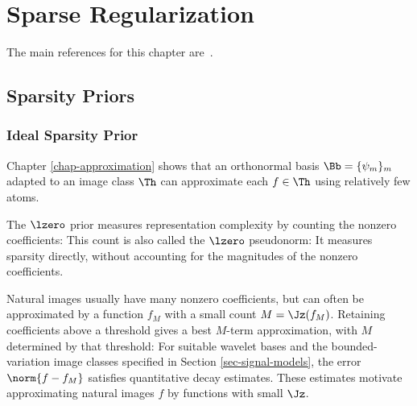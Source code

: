 
\chapter{Sparse Regularization}
\label{chap-sparse-regul}

The main references for this chapter are~\cite{mallat2008wavelet,starck2015sparse,scherzer2009variational}.


\section{Sparsity Priors}

\subsection{Ideal Sparsity Prior}

Chapter \ref{chap-approximation} shows that an orthonormal basis $\Bb = \{ \psi_m \}_m$ adapted to an image class $\Th$ can approximate each $f\in\Th$ using relatively few atoms.

The $\lzero$ prior measures representation complexity by counting the nonzero coefficients:
This count is also called the $\lzero$ pseudonorm:
It measures sparsity directly, without accounting for the magnitudes of the nonzero coefficients.

Natural images usually have many nonzero coefficients, but can often be approximated by a function $f_M$ with a small count $M=\Jz(f_M)$. Retaining coefficients above a threshold gives a best $M$-term approximation, with $M$ determined by that threshold:
For suitable wavelet bases and the bounded-variation image classes specified in Section \ref{sec-signal-models}, the error $\norm{f-f_M}$ satisfies quantitative decay estimates. These estimates motivate approximating natural images $f$ by functions with small $\Jz$.

